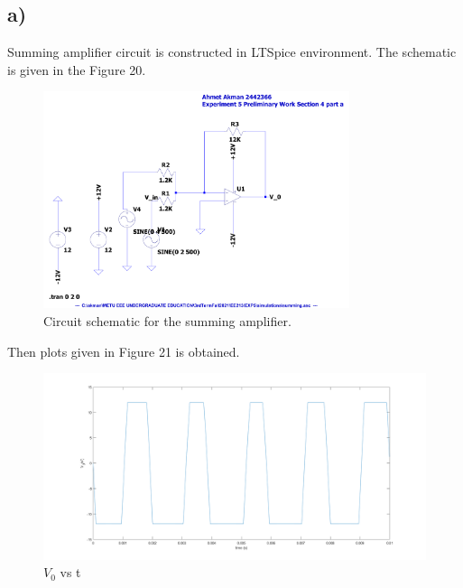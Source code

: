 \documentclass[letterpaper,12pt]{article}
\begin{document}
\subsection{a)}
Summing amplifier circuit is constructed in LTSpice environment. The schematic is given in the Figure 20.
\begin{figure}[H]
	\centering
   \includegraphics[width=0.8\textwidth]{summing_SCH.pdf}
   \caption{Circuit schematic for the summing amplifier.}
\end{figure} 
Then plots given in Figure 21 is obtained.
\begin{figure}[H]
	\centering
   \includegraphics[width=1\textwidth]{4a_vs_t.png}
   \caption{\(V_0\) vs t}
\end{figure}
\end{document}
